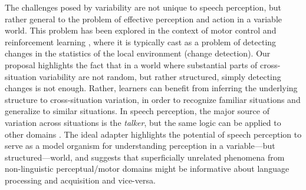 The challenges posed by variability are not unique to speech perception, but rather general to the problem of effective perception and action in a variable world.  This problem has been explored in the context of motor control \autocite[e.g.,][]{Kording2007} and reinforcement learning \autocite[e.g.,][]{Cho2002,Gallistel2001}, where it is typically cast as a problem of detecting changes in the statistics of the local environment (change detection).  Our proposal highlights the fact that in a world where substantial parts of cross-situation variability are not random, but rather structured, simply detecting changes is not enough.  Rather, learners can benefit from inferring the underlying structure to cross-situation variation, in order to recognize familiar situations and generalize to similar situations.  In speech perception, the major source of variation across situations is the \emph{talker}, but the same logic can be applied to other domains \autocite{Qian2012,Qian2013}.  The ideal adapter highlights the potential of speech perception to serve as a model organism for understanding perception in a variable---but structured---world, and suggests that superficially unrelated phenomena from non-linguistic perceptual/motor domains might be informative about language processing and acquisition and vice-versa.

